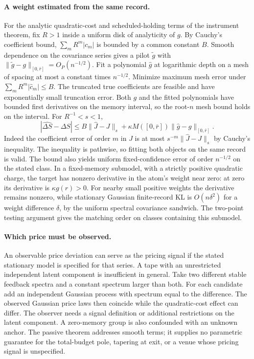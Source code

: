 \documentclass[12pt]{article}
\theoremstyle{definition}
\theoremstyle{remark}
\begin{document}
\paragraph{A weight estimated from the same record.}
For the analytic quadratic-cost and scheduled-holding terms of the instrument
theorem, fix $R>1$ inside a uniform disk of analyticity of $g$. By Cauchy's
coefficient bound, $\sum_mR^m|c_m|$ is bounded by a common constant $B$.
Smooth dependence on the covariance series gives a pilot $\tilde g$ with
$\|\tilde g-g\|_{[0,\bar r]}=O_P(n^{-1/2})$. Fit a polynomial $\hat g$ at
logarithmic depth on a mesh of spacing at most a constant times $n^{-1/2}$.
Minimize maximum mesh error under $\sum_mR^m|\hat c_m|\le B$. The truncated
true coefficients are feasible and have exponentially small truncation error.
Both $g$ and the fitted polynomials have bounded first derivatives on the
memory interval, so the root-$n$ mesh bound holds on the interval. For
$R^{-1}<s<1$,
\[
 |\widehat{\Delta S}-\Delta S|
 \le B\|\hat J-J\|_s+\kappa M([0,\bar r])\|\hat g-g\|_{[0,\bar r]} .
\]
Indeed the coefficient error of order $m$ in $J$ is at most
$s^{-m}\|\hat J-J\|_s$ by Cauchy's inequality. The inequality is pathwise,
so fitting both objects on the same record is valid. The bound also yields
uniform fixed-confidence error of order $n^{-1/2}$ on the stated class.
In a fixed-memory submodel, with a strictly positive quadratic charge, the
target has nonzero derivative in the atom's weight near zero: at zero its
derivative is $\kappa g(r)>0$. For nearby small positive weights the derivative
remains nonzero, while stationary Gaussian finite-record KL is $O(n\delta^2)$
for a weight difference $\delta$, by the uniform spectral covariance
sandwich. The two-point testing argument gives the matching order on classes
containing this submodel.

\paragraph{Which price must be observed.}
An observable price deviation can serve as the pricing signal if the stated
stationary model is specified for that series. A tape with an unrestricted
independent latent component is insufficient in general. Take two different
stable feedback spectra and a constant spectrum larger than both. For each
candidate add an independent Gaussian process with spectrum equal to the
difference. The observed Gaussian price laws then coincide while the
quadratic-cost effect can differ. The observer needs a signal definition or
additional restrictions on the latent component. A zero-memory group is also
confounded with an unknown anchor. The passive theorem addresses smooth terms;
it supplies no parametric guarantee for the total-budget pole, tapering at exit,
or a venue whose pricing signal is unspecified.
\end{document}
